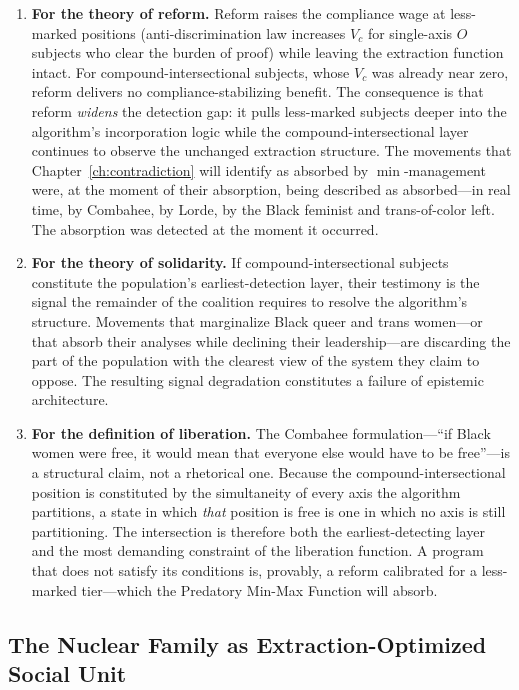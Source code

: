 \begin{enumerate}
    \item \textbf{For the theory of reform.} Reform raises the compliance wage at less-marked positions (anti-discrimination law increases $V_c$ for single-axis $O$ subjects who clear the burden of proof) while leaving the extraction function intact. For compound-intersectional subjects, whose $V_c$ was already near zero, reform delivers no compliance-stabilizing benefit. The consequence is that reform \textit{widens} the detection gap: it pulls less-marked subjects deeper into the algorithm's incorporation logic while the compound-intersectional layer continues to observe the unchanged extraction structure. The movements that Chapter~\ref{ch:contradiction} will identify as absorbed by $\min$-management were, at the moment of their absorption, being described as absorbed---in real time, by Combahee, by Lorde, by the Black feminist and trans-of-color left. The absorption was detected at the moment it occurred.

    \item \textbf{For the theory of solidarity.} If compound-intersectional subjects constitute the population's earliest-detection layer, their testimony is the signal the remainder of the coalition requires to resolve the algorithm's structure. Movements that marginalize Black queer and trans women---or that absorb their analyses while declining their leadership---are discarding the part of the population with the clearest view of the system they claim to oppose. The resulting signal degradation constitutes a failure of epistemic architecture.

    \item \textbf{For the definition of liberation.} The Combahee formulation---``if Black women were free, it would mean that everyone else would have to be free''---is a structural claim, not a rhetorical one. Because the compound-intersectional position is constituted by the simultaneity of every axis the algorithm partitions, a state in which \textit{that} position is free is one in which no axis is still partitioning. The intersection is therefore both the earliest-detecting layer and the most demanding constraint of the liberation function. A program that does not satisfy its conditions is, provably, a reform calibrated for a less-marked tier---which the Predatory Min-Max Function will absorb.
\end{enumerate}

\subsection{The Nuclear Family as Extraction-Optimized Social Unit}

